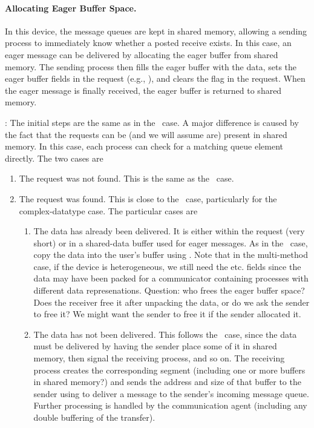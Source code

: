 \paragraph{Allocating Eager Buffer Space.}
In this device, the message queues are kept in shared memory, allowing a
sending process to immediately know whether a posted receive exists.  In this
case, an eager message can be delivered by allocating the eager buffer from
shared memory.  The sending process then fills the eager buffer with the data,
sets the eager buffer fields in the request (e.g., ),
and clears the  flag in the request.  When the eager message is
finally received, the eager buffer is returned to shared memory.

:
The initial steps are the same as in the \tcpname\ case.  A major difference
is caused by the fact that the requests can be (and we will assume are)
present in shared memory.  In this case, each process can check for a matching
queue element directly. The two cases are
\begin{enumerate}
\item The request was not found.  This is the same as the \tcpname\ case.
\item The request was found.  This is close to the \tcpname\ case,
  particularly for the complex-datatype case.  The particular cases are
  \begin{enumerate}
  \item The data has already been delivered.  It is either within the request
    (very short) or in a shared-data buffer used for eager messages.  As in
    the \tcpname\ case, copy the data into the user's buffer using
    .  Note that in the multi-method case, if the device
    is heterogeneous, we still need the  etc. fields
    since the data may have been packed for a communicator containing
    processes with different data represenations.
    Question: who frees the eager buffer space?  Does the receiver free it
    after unpacking the data, or do we ask the sender to free it?  We might
    want the sender to free it if the sender allocated it.

  \item The data has not been delivered.  This follows the \tcpname\ case,
    since the data must be delivered by having the sender place some of it in
    shared memory, then signal the receiving process, and so on.  The
    receiving process creates the corresponding segment (including one or more
    buffers in shared memory?) and sends the address and size of that buffer
    to the sender using  to deliver a message to the
    sender's incoming message queue.  Further processing is handled by the
    communication agent (including any double buffering of the transfer).
  \end{enumerate}
\end{enumerate}


